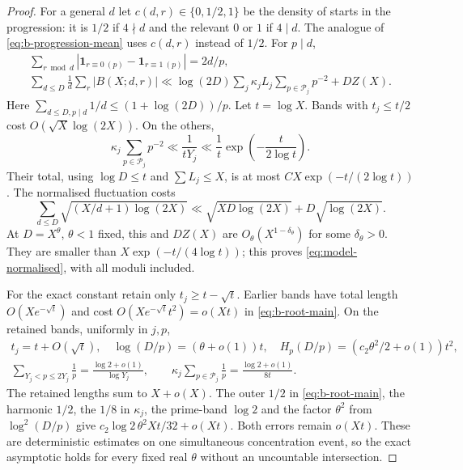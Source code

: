 \documentclass[11pt]{article}
\theoremstyle{definition}
\newcommand{\ind}{\mathbf 1}
\theoremstyle{remark}
\numberwithin{equation}{section}
\begin{document}
\begin{proof}
For a general $d$ let $c(d,r)\in\{0,1/2,1\}$ be the density of starts in the progression:
it is $1/2$ if $4\nmid d$ and the relevant $0$ or $1$ if $4\mid d$.
The analogue of \eqref{eq:b-progression-mean} uses $c(d,r)$ instead of $1/2$.
For $p\mid d$,
\begin{equation}\label{eq:b-residue-mean-bound}
\begin{gathered}
 \sum_{r\bmod d}|\ind_{r\equiv0\ (p)}-\ind_{r\equiv1\ (p)}|=2d/p,\\
 \sum_{d\le D}\frac1d\sum_r|B(X;d,r)|
 \ll\log(2D)\sum_j\kappa_jL_j\sum_{p\in\mathcal P_j}p^{-2}+DZ(X).
\end{gathered}
\end{equation}
Here $\sum_{d\le D,p\mid d}1/d\le(1+\log(2D))/p$.
Let $t=\log X$. Bands with $t_j\le t/2$ cost $O(\sqrt X\log(2X))$.
On the others,
\begin{equation}\label{eq:b-late-residue-bands}
 \kappa_j\sum_{p\in\mathcal P_j}p^{-2}\ll\frac1{tY_j}
 \ll\frac1t\exp\left(-\frac{t}{2\log t}\right).
\end{equation}
Their total, using $\log D\le t$ and $\sum L_j\le X$, is at most $CX\exp(-t/(2\log t))$.
The normalised fluctuation costs
\begin{equation}\label{eq:b-normalised-error}
 \sum_{d\le D}\sqrt{(X/d+1)\log(2X)}
 \ll\sqrt{XD\log(2X)}+D\sqrt{\log(2X)}.
\end{equation}
At $D=X^\theta$, $\theta<1$ fixed, this and $DZ(X)$ are $O_\theta(X^{1-\delta_\theta})$ for some
$\delta_\theta>0$. They are smaller than $X\exp(-t/(4\log t))$; this proves
\eqref{eq:model-normalised}, with all moduli included.

For the exact constant retain only $t_j\ge t-\sqrt t$. Earlier bands have total length
$O(Xe^{-\sqrt t})$ and cost $O(Xe^{-\sqrt t}t^2)=o(Xt)$ in \eqref{eq:b-root-main}.
On the retained bands, uniformly in $j,p$,
\begin{equation}\label{eq:b-constant-factors}
\begin{gathered}
 t_j=t+O(\sqrt t),\quad\log(D/p)=(\theta+o(1))t,\quad
 H_p(D/p)=(c_2\theta^2/2+o(1))t^2,\\
 \sum_{Y_j<p\le2Y_j}\frac1p=\frac{\log2+o(1)}{\log Y_j},\qquad
 \kappa_j\sum_{p\in\mathcal P_j}\frac1p=\frac{\log2+o(1)}{8t}.
\end{gathered}
\end{equation}
The retained lengths sum to $X+o(X)$. The outer $1/2$ in \eqref{eq:b-root-main}, the harmonic $1/2$,
the $1/8$ in $\kappa_j$, the prime-band $\log2$ and the factor $\theta^2$ from $\log^2(D/p)$ give
$c_2\log2\,\theta^2Xt/32+o(Xt)$. Both errors remain $o(Xt)$.
These are deterministic estimates on one simultaneous concentration event, so the exact asymptotic
holds for every fixed real $\theta$ without an uncountable intersection.


\end{proof}
\end{document}
